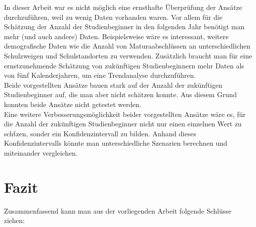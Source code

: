 In dieser Arbeit war es nicht m\"oglich eine ernsthafte \"Uberpr\"ufung der Ans\"atze durchzuf\"uhren, weil zu wenig Daten vorhanden waren.
Vor allem f\"ur die Sch\"atzung der Anzahl der Studienbeginner in den folgenden Jahr ben\"otigt man mehr (und auch andere) Daten. Beispielsweise
w\"are es interessant, weitere demografische Daten wie die Anzahl von Maturaabschl\"ussen an unterschiedlichen Schulzweigen und Schulstandorten zu verwenden.
Zus\"atzlich braucht man f\"ur eine ernstzunehmende Sch\"atzung von zuk\"unftigen Studienbeginnern mehr Daten als von f\"unf Kalenderjahren, um eine Trendanalyse
durchzuf\"uhren. \\

Beide vorgestellten Ans\"atze bauen stark auf der Anzahl der zuk\"unftigen Studienbeginner auf, die man aber nicht sch\"atzen konnte. Aus diesem Grund konnten
beide Ans\"atze nicht getestet werden. \\

Eine weitere Verbesserungsm\"oglichkeit beider vorgestellten Ans\"atze w\"are es, f\"ur die Anzahl der zuk\"unftigen Studienbeginner nicht nur einen einzelnen Wert
zu sch\"tzen, sonder ein Konfidenzintervall zu bilden. Anhand dieses Konfidenzintervalls k\"onnte man unterschiedliche Szenarien berechnen und miteinander vergleichen.







\section{Fazit}

Zusammenfassend kann man aus der vorliegenden Arbeit folgende Schl\"usse ziehen:

